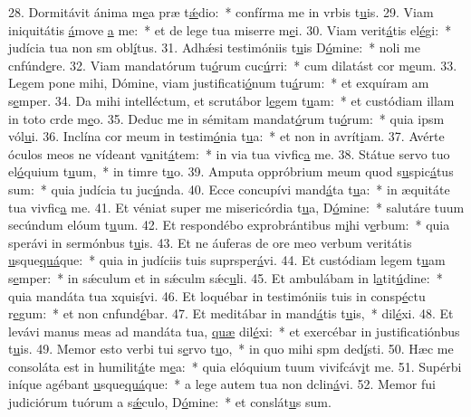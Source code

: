 28. Dormitávit ánima m\uline{e}a præ t\uline{ǽ}dio:~* confírma me in vrbis t\uline{u}is.
29. Viam iniquitátis \uline{á}move \uline{a} me:~* et de lege tua miserre m\uline{e}i.
30. Viam verit\uline{á}tis el\uline{é}gi:~* judícia tua non sm obl\uline{í}tus.
31. Adhǽsi testimóniis t\uline{u}is D\uline{ó}mine:~* noli me cnfúnd\uline{e}re.
32. Viam mandatórum tu\uline{ó}rum cuc\uline{ú}rri:~* cum dilatást cor m\uline{e}um.
33. Legem pone mihi, Dómine, viam justificati\uline{ó}num tu\uline{á}rum:~* et exquíram am s\uline{e}mper.
34. Da mihi intelléctum, et scrutábor l\uline{e}gem t\uline{u}am:~* et custódiam illam in toto crde m\uline{e}o.
35. Deduc me in sémitam mandat\uline{ó}rum tu\uline{ó}rum:~* quia ipsm vól\uline{u}i.
36. Inclína cor meum in testim\uline{ó}nia t\uline{u}a:~* et non in avrít\uline{i}am.
37. Avérte óculos meos ne vídeant v\uline{a}nit\uline{á}tem:~* in via tua vivfic\uline{a} me.
38. Státue servo tuo el\uline{ó}quium t\uline{u}um,~* in timre t\uline{u}o.
39. Amputa oppróbrium meum quod s\uline{u}spic\uline{á}tus sum:~* quia judícia tu juc\uline{ú}nda.
40. Ecce concupívi mand\uline{á}ta t\uline{u}a:~* in æquitáte tua vivfic\uline{a} me.
41. Et véniat super me misericórdia t\uline{u}a, D\uline{ó}mine:~* salutáre tuum secúndum elóum t\uline{u}um.
42. Et respondébo exprobrántibus m\uline{i}hi v\uline{e}rbum:~* quia sperávi in sermónbus t\uline{u}is.
43. Et ne áuferas de ore meo verbum veritátis \uline{u}sque\uline{quá}que:~* quia in judíciis tuis suprsper\uline{á}vi.
44. Et custódiam legem t\uline{u}am s\uline{e}mper:~* in sǽculum et in sǽculm sǽc\uline{u}li.
45. Et ambulábam in l\uline{a}tit\uline{ú}dine:~* quia mandáta tua xquis\uline{í}vi.
46. Et loquébar in testimóniis tuis in consp\uline{é}ctu r\uline{e}gum:~* et non cnfund\uline{é}bar.
47. Et meditábar in mand\uline{á}tis t\uline{u}is,~*  dil\uline{é}xi.
48. Et levávi manus meas ad mandáta tua, \uline{quæ} dil\uline{é}xi:~* et exercébar in justificatiónbus t\uline{u}is.
49. Memor esto verbi tui s\uline{e}rvo t\uline{u}o,~* in quo mihi spm ded\uline{í}sti.
50. Hæc me consoláta est in humilit\uline{á}te m\uline{e}a:~* quia elóquium tuum vivifcáv\uline{i}t me.
51. Supérbi iníque agébant \uline{u}sque\uline{quá}que:~* a lege autem tua non dclin\uline{á}vi.
52. Memor fui judiciórum tuórum a s\uline{ǽ}culo, D\uline{ó}mine:~* et conslát\uline{u}s sum.

